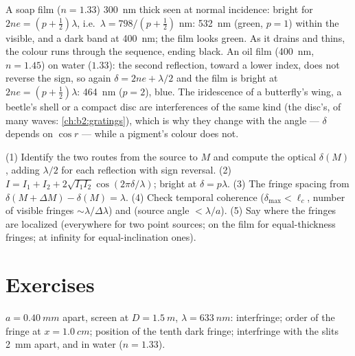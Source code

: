\begin{example}\label{ex:b2:two-wave-interference:colours}
A soap film ($n = 1.33$) \qty{300}{nm} thick seen at normal incidence:
bright for $2ne = (p + \tfrac12)\lambda$, i.e.\ $\lambda = 798/(p + \tfrac12)$ nm: \qty{532}{nm}
(green, $p = 1$) within the visible, and a dark band at \qty{400}{nm}; the
film looks green. As it drains and thins, the colour runs through the
sequence, ending black. An oil film (\qty{400}{nm}, $n = 1.45$) on water
($1.33$): the second reflection, toward a lower index, does not reverse
the sign, so again $\delta = 2ne + \lambda/2$ and the film is bright at $2ne =
(p + \tfrac12)\lambda$: \qty{464}{nm} ($p = 2$), blue. The iridescence of a
butterfly's wing, a beetle's shell or a compact disc are interferences
of the same kind (the disc's, of many waves: \cref{ch:b2:gratings}),
which is why they change with the angle --- $\delta$ depends on $\cos r$ ---
while a pigment's colour does not.
\end{example}

\begin{method}\label{met:b2:two-wave-interference:method}
(1) Identify the two routes from the source to $M$ and compute the
optical  $\delta(M)$, adding $\lambda/2$ for each reflection
with sign reversal. (2) $I = I_1 + I_2 + 2\sqrt{I_1I_2}\cos(2\pi\delta/\lambda)$;
bright at $\delta = p\lambda$. (3) The fringe spacing from $\delta(M + \Delta M) - \delta(M) =
\lambda$. (4) Check temporal coherence ($\delta_{\max} < \ell_c$, number of
visible fringes $\sim\lambda/\Delta\lambda$) and  (source angle
$< \lambda/a$). (5) Say where the fringes are localized (everywhere for two
point sources; on the film for equal-thickness fringes; at infinity
for equal-inclination ones).
\end{method}

\section{Exercises}

\begin{exercise}[$\star$]\label{exo:b2:two-wave-interference:1}
 $a = \qty{0.40}{mm}$ apart, screen at $D = \qty{1.5}{m}$, $\lambda =
\qty{633}{nm}$: interfringe; order of the fringe at $x = \qty{1.0}{cm}$; position
of the tenth dark fringe; interfringe with the slits \qty{2}{mm} apart,
and in water ($n = 1.33$).
\end{exercise}

